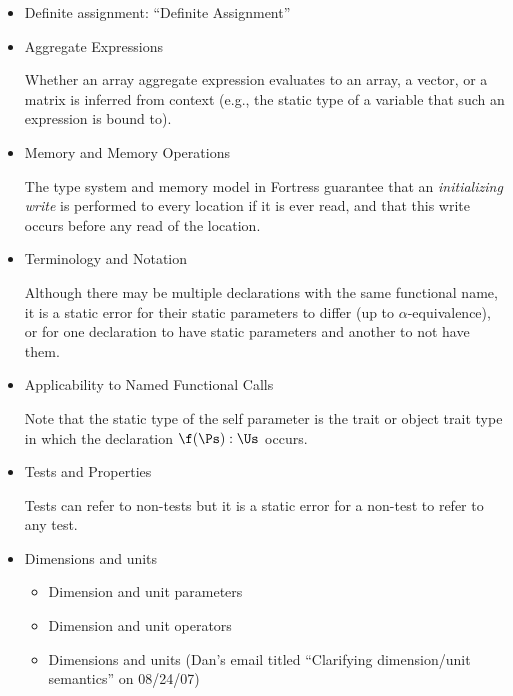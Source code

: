 \begin{itemize}
\begin{itemize}
 \item Definite assignment: ``Definite Assignment''


\item %
 Aggregate Expressions

Whether an array aggregate expression evaluates to an array, a vector, or a
matrix is inferred from context
(e.g., the static type of a variable that such an expression is bound to).

\item %
 Memory and Memory Operations

The type system and memory model in Fortress guarantee that an
\emph{initializing write} is performed to every location if it is ever read,
and that this write occurs before any read of the location.

\item %
 Terminology and Notation

Although there may be multiple declarations with the same functional name,
it is a static error for their static parameters to differ
(up to $\alpha$-equivalence),
or for one declaration to have static parameters and another to not have them.

\item %
 Applicability to Named Functional Calls

Note that the static
type of the self parameter is the trait or object trait type in which
the declaration $\f(\Ps):\Us$ occurs.

\item {} Tests and Properties

Tests can refer to non-tests but
it is a static error for a non-test to refer to any test.


\item Dimensions and units
 \begin{itemize}
 \item Dimension and unit parameters
 \item Dimension and unit operators
\item Dimensions and units (Dan's email titled ``Clarifying dimension/unit semantics'' on 08/24/07)
 \end{itemize}


\end{itemize}
\end{itemize}
